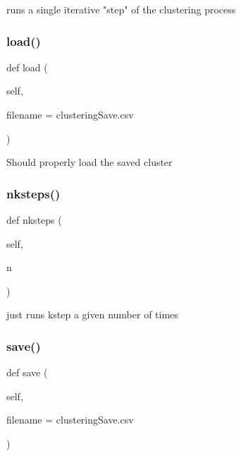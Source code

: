 \begin{DoxyVerb}runs a single iterative "step" of the clustering process
\end{DoxyVerb}
 \mbox{\label{classdynamicfilterapp_1_1simulation__files_1_1cluster_1_1_clusterk_d_a18504b8b07553648ef9de144b3e474cd}} 
\subsubsection{\texorpdfstring{load()}{load()}}
{\footnotesize\ttfamily def load (\begin{DoxyParamCaption}\item[{}]{self,  }\item[{}]{filename = {\ttfamily \textquotesingle{}clusteringSave.csv\textquotesingle{}} }\end{DoxyParamCaption})}

\begin{DoxyVerb}Should properly load the saved cluster
\end{DoxyVerb}
 \mbox{\label{classdynamicfilterapp_1_1simulation__files_1_1cluster_1_1_clusterk_d_a1bf958ffea51106b8773ba1da5a126bb}} 
\subsubsection{\texorpdfstring{nksteps()}{nksteps()}}
{\footnotesize\ttfamily def nksteps (\begin{DoxyParamCaption}\item[{}]{self,  }\item[{}]{n }\end{DoxyParamCaption})}

\begin{DoxyVerb}just runs kstep a given number of times
\end{DoxyVerb}
 \mbox{\label{classdynamicfilterapp_1_1simulation__files_1_1cluster_1_1_clusterk_d_a721907707298d7ae10d1704bcdf68461}} 
\subsubsection{\texorpdfstring{save()}{save()}}
{\footnotesize\ttfamily def save (\begin{DoxyParamCaption}\item[{}]{self,  }\item[{}]{filename = {\ttfamily \textquotesingle{}clusteringSave.csv\textquotesingle{}} }\end{DoxyParamCaption})}

